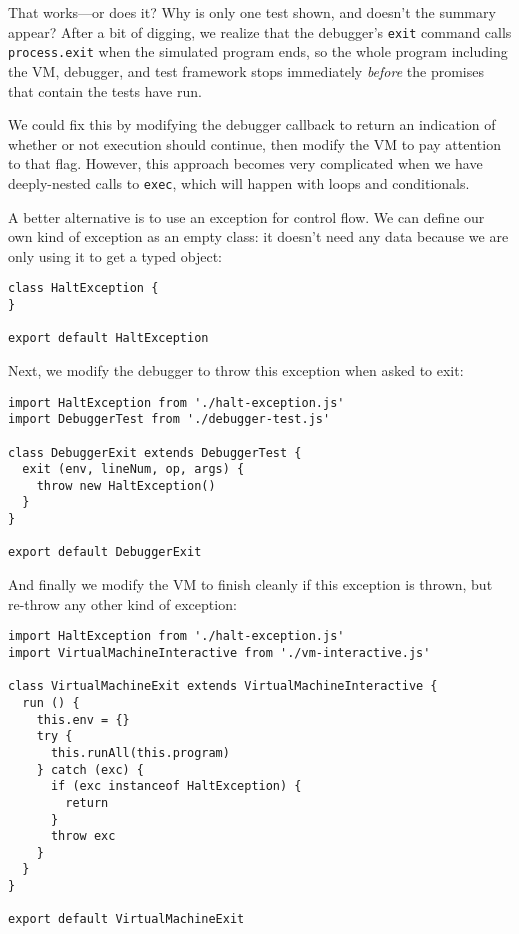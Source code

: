 \documentclass[krantzl]{krantz}
\begin{document}
That works---or does it?
Why is only one test shown,
and doesn't the summary appear?
After a bit of digging,
we realize that the debugger's \texttt{exit} command calls \texttt{process.exit} when the simulated program ends,
so the whole program including the VM, debugger, and test framework stops immediately
\emph{before} the promises that contain the tests have run.


We could fix this by modifying the debugger callback
to return an indication of whether or not execution should continue,
then modify the VM to pay attention to that flag.
However,
this approach becomes very complicated when we have deeply-nested calls to \texttt{exec},
which will happen with loops and conditionals.


A better alternative is to use an exception for control flow.
We can define our own kind of exception as an empty class:
it doesn't need any data
because we are only using it to get a typed object:


\begin{lstlisting}[frame=single,frameround=tttt]
class HaltException {
}

export default HaltException
\end{lstlisting}



\noindent Next,
we modify the debugger to throw this exception when asked to exit:


\begin{lstlisting}[frame=single,frameround=tttt]
import HaltException from './halt-exception.js'
import DebuggerTest from './debugger-test.js'

class DebuggerExit extends DebuggerTest {
  exit (env, lineNum, op, args) {
    throw new HaltException()
  }
}

export default DebuggerExit
\end{lstlisting}



\noindent And finally
we modify the VM to finish cleanly if this exception is thrown,
but re-throw any other kind of exception:


\begin{lstlisting}[frame=single,frameround=tttt]
import HaltException from './halt-exception.js'
import VirtualMachineInteractive from './vm-interactive.js'

class VirtualMachineExit extends VirtualMachineInteractive {
  run () {
    this.env = {}
    try {
      this.runAll(this.program)
    } catch (exc) {
      if (exc instanceof HaltException) {
        return
      }
      throw exc
    }
  }
}

export default VirtualMachineExit
\end{lstlisting}
\end{document}
